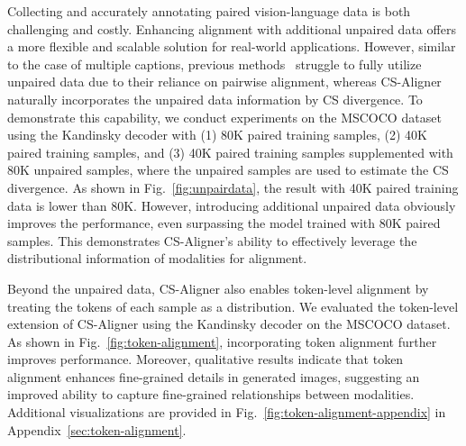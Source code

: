 Collecting and accurately annotating paired vision-language data is both challenging and costly. Enhancing alignment with additional unpaired data offers a more flexible and scalable solution for real-world applications. However, similar to the case of multiple captions, previous methods~\cite{radford2021learning, patel2024eclipse} struggle to fully utilize unpaired data due to their reliance on pairwise alignment, whereas CS-Aligner naturally incorporates the unpaired data information by CS divergence.
To demonstrate this capability, we conduct experiments on the MSCOCO dataset using the Kandinsky decoder with (1) 80K paired training samples, (2) 40K paired training samples, and (3) 40K paired training samples supplemented with 80K unpaired samples, where the unpaired samples are used to estimate the CS divergence. {As shown in Fig.~\ref{fig:unpairdata},} 
the result with 40K paired training data is lower than 80K. However, introducing additional unpaired data obviously improves the performance, even surpassing the model trained with 80K paired samples. This demonstrates CS-Aligner's ability to effectively leverage the distributional information of modalities for alignment.





Beyond the unpaired data, CS-Aligner also enables token-level alignment by treating the tokens of each sample as a distribution.  
We evaluated the token-level extension of CS-Aligner using the Kandinsky decoder on the MSCOCO dataset. As shown in Fig.~\ref{fig:token-alignment}, incorporating token alignment further improves performance. Moreover, qualitative results indicate that token alignment enhances fine-grained details in generated images, suggesting an improved ability to capture fine-grained relationships between modalities.  
Additional visualizations are provided in Fig.~\ref{fig:token-alignment-appendix} in Appendix~\ref{sec:token-alignment}.

